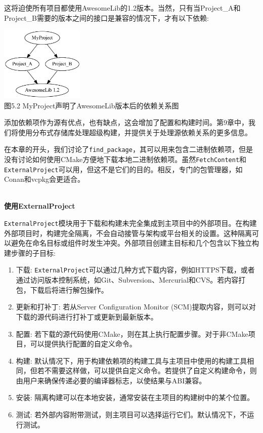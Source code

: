 这将迫使所有项目都使用AwesomeLib的1.2版本。当然，只有当Project\_A和Project\_B需要的版本之间的接口是兼容的情况下，才有以下依赖:

\begin{center}
\includegraphics[width=0.3\textwidth]{content/2/chapter5/images/2.jpg}\\
图5.2  MyProject声明了AwesomeLib版本后的依赖关系图
\end{center}

添加依赖项作为源有优点，也有缺点，这会增加了配置和构建时间。第9章中，我们将使用分布式存储库处理超级构建，并提供关于处理源依赖关系的更多信息。

在本章的开头，我们讨论了\texttt{find\_package}，其可以用来包含二进制依赖项，但是没有讨论如何使用CMake方便地下载本地二进制依赖项。虽然\texttt{FetchContent}和\texttt{ExternalProject}可以用，但这不是它们的目的。相反，专门的包管理器，如Conan和vcpkg会更适合。

\hspace*{\fill} \\ %
\noindent
\textbf{使用ExternalProject}

\texttt{ExternalProject}模块用于下载和构建未完全集成到主项目中的外部项目。在构建外部项目时，构建完全隔离，不会自动接管与架构或平台相关的设置。这种隔离可以避免在命名目标或组件时发生冲突。外部项目创建主目标和几个包含以下独立构建步骤的子目标:

\begin{enumerate}
\item 
下载: \texttt{ExternalProject}可以通过几种方式下载内容，例如HTTPS下载，或者通过访问版本控制系统，如Git、Subversion、Mercurial和CVS。若内容打包，下载后将进行解包操作。

\item 
更新和打补丁: 若从Server Configuration Monitor (SCM)提取内容，则可以对下载的源代码进行打补丁或更新到最新版本。

\item 
配置: 若下载的源代码使用CMake，则在其上执行配置步骤。对于非CMake项目，可以提供执行配置的自定义命令。

\item 
构建: 默认情况下，用于构建依赖项的构建工具与主项目中使用的构建工具相同，但若不需要这样做，可以提供自定义命令。若提供了自定义构建命令，则由用户来确保传递必要的编译器标志，以使结果与ABI兼容。

\item 
安装: 隔离构建可以在本地安装，通常安装在主项目的构建树中的某个位置。

\item 
测试: 若外部内容附带测试，则主项目可以选择运行它们。默认情况下，不运行测试。
\end{enumerate}

